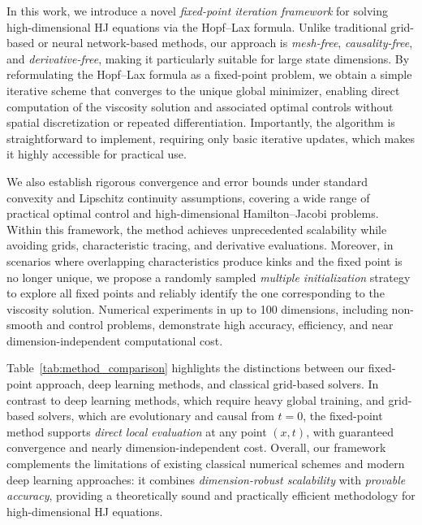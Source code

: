 \documentclass[review,hidelinks,onefignum,onetabnum]{siamart250106}
\begin{document}
In this work, we introduce a novel \emph{fixed-point iteration framework} for solving high-dimensional HJ equations via the Hopf--Lax formula. Unlike traditional grid-based or neural network-based methods, our approach is \emph{mesh-free}, \emph{causality-free}, and \emph{derivative-free}, making it particularly suitable for large state dimensions. By reformulating the Hopf--Lax formula as a fixed-point problem, we obtain a simple iterative scheme that converges to the unique global minimizer, enabling direct computation of the viscosity solution and associated optimal controls without spatial discretization or repeated differentiation.  
Importantly, the algorithm is straightforward to implement, requiring only basic iterative updates, which makes it highly accessible for practical use.

We also establish rigorous convergence and error bounds under standard convexity and Lipschitz continuity assumptions, covering a wide range of practical optimal control and high-dimensional Hamilton--Jacobi problems. Within this framework, the method achieves unprecedented scalability while avoiding grids, characteristic tracing, and derivative evaluations. Moreover, in scenarios where overlapping characteristics produce kinks and the fixed point is no longer unique, we propose a randomly sampled \emph{multiple initialization} strategy to explore all fixed points and reliably identify the one corresponding to the viscosity solution. Numerical experiments in up to 100 dimensions, including non-smooth and control problems, demonstrate high accuracy, efficiency, and near dimension-independent computational cost.  

Table~\ref{tab:method_comparison} highlights the distinctions between our fixed-point approach, deep learning methods, and classical grid-based solvers. In contrast to deep learning methods, which require heavy global training, and grid-based solvers, which are evolutionary and causal from $t=0$, the fixed-point method supports \emph{direct local evaluation} at any point $(x,t)$, with guaranteed convergence and nearly dimension-independent cost.  
Overall, our framework complements the limitations of existing classical numerical schemes and modern deep learning approaches: it combines \emph{dimension-robust scalability} with \emph{provable accuracy}, providing a theoretically sound and practically efficient methodology for high-dimensional HJ equations.
\end{document}
